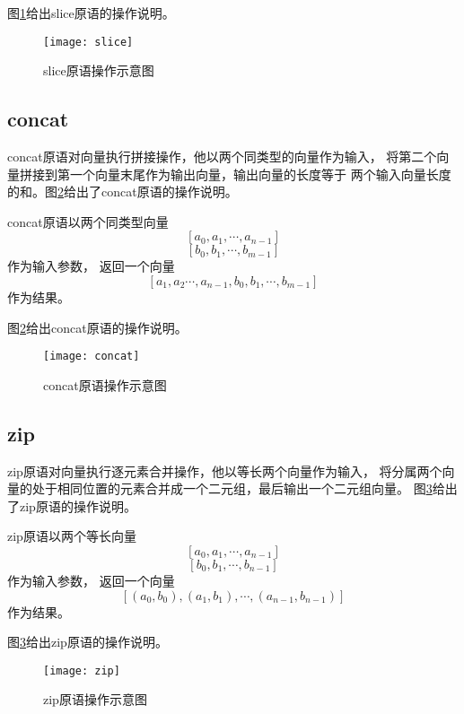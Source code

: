 图\ref{fig:slice-diagram}给出slice原语的操作说明。
\begin{figure}[h]
  \centering
  \texttt{[image: slice]}
  \caption{slice原语操作示意图}
  \label{fig:slice-diagram}
\end{figure}

\subsection{concat}
concat原语对向量执行拼接操作，他以两个同类型的向量作为输入，
将第二个向量拼接到第一个向量末尾作为输出向量，输出向量的长度等于
两个输入向量长度的和。图\ref{fig:concat-diagram}给出了concat原语的操作说明。
\begin{definition}
  concat原语以两个同类型向量$$[a_0, a_1, \cdots, a_{n-1}]$$ $$[b_0, b_1, \cdots, b_{m-1}]$$作为输入参数，
  返回一个向量$$[a_1, a_2 \cdots, a_{n-1}, b_0, b_1, \cdots, b_{m-1}]$$作为结果。
\end{definition}

图\ref{fig:concat-diagram}给出concat原语的操作说明。
\begin{figure}[h]
  \centering
  \texttt{[image: concat]}
  \caption{concat原语操作示意图}
  \label{fig:concat-diagram}
\end{figure}

\subsection{zip}
zip原语对向量执行逐元素合并操作，他以等长两个向量作为输入，
将分属两个向量的处于相同位置的元素合并成一个二元组，最后输出一个二元组向量。
图\ref{fig:zip-diagram}给出了zip原语的操作说明。
\begin{definition}
  zip原语以两个等长向量$$[a_0, a_1, \cdots, a_{n-1}]$$ $$[b_0, b_1, \cdots, b_{n-1}]$$作为输入参数，
  返回一个向量$$[(a_0, b_0), (a_1, b_1), \cdots, (a_{n-1}, b_{n-1})]$$作为结果。
\end{definition}

图\ref{fig:zip-diagram}给出zip原语的操作说明。
\begin{figure}[h]
  \centering
  \texttt{[image: zip]}
  \caption{zip原语操作示意图}
  \label{fig:zip-diagram}
\end{figure}


